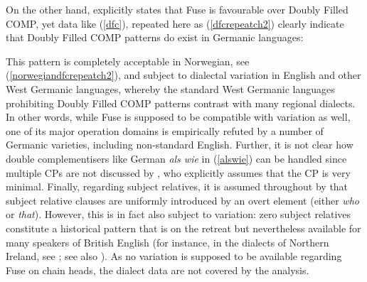 On the other hand, \citet{sobin2002} explicitly states that Fuse is favourable over Doubly Filled COMP, yet data like (\ref{dfc}), repeated here as (\ref{dfcrepeatch2}) clearly indicate that Doubly Filled COMP patterns do exist in Germanic languages:

\ea \label{dfcrepeatch2}
\z
\z

This pattern is completely acceptable in Norwegian, see (\ref{norwegiandfcrepeatch2}), and subject to dialectal variation in English and other West Germanic languages, whereby the standard West Germanic languages prohibiting Doubly Filled COMP patterns contrast with many regional dialects. In other words, while Fuse is supposed to be compatible with variation as well, one of its major operation domains is empirically refuted by a number of Germanic varieties, including non-standard English. Further, it is not clear how double complementisers like German \textit{als wie} in (\ref{alswie}) can be handled since multiple CPs are not discussed by \citet{sobin2002}, who explicitly assumes that the CP is very minimal. Finally, regarding subject relatives, it is assumed throughout by \citet{sobin2002} that subject relative clauses are uniformly introduced by an overt element (either \textit{who} or \textit{that}). However, this is in fact also subject to variation: zero subject relatives constitute a historical pattern that is on the retreat but nevertheless available for many speakers of British English (for instance, in the dialects of Northern Ireland, see \citealt[55--56]{herrmann2005}; see also \citealt{kortmannwagner2007}). As no variation is supposed to be available regarding Fuse on chain heads, the dialect data are not covered by the analysis.

